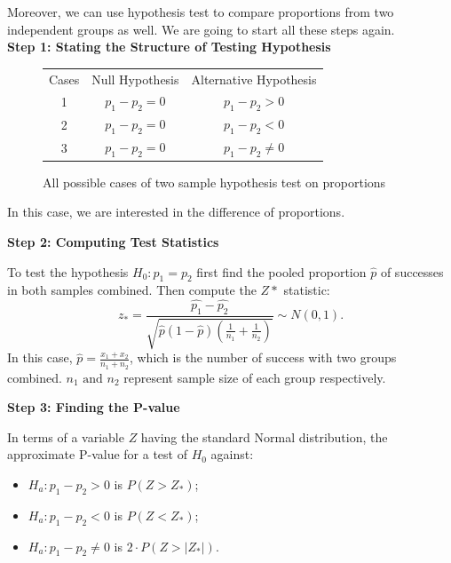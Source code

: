 Moreover, we can use hypothesis test to compare proportions from two independent groups as well. We are going to start all these steps again.\\

\textbf{Step 1: Stating the Structure of Testing Hypothesis}

\begin{center}
\begin{figure}[H]
\centering
\begin{tabular}{ c c c }
Cases & Null Hypothesis & Alternative Hypothesis \\
     1	   & $p_1 - p_2 = 0$ & $p_1 - p_2 > 0$ \\
     2	   & $p_1 - p_2 = 0$ & $p_1 - p_2 < 0$ \\
     3    & $p_1 - p_2 = 0$ & $p_1 - p_2 \neq 0$ \\
\end{tabular}
\caption{All possible cases of two sample hypothesis test on proportions}
\end{figure}
\end{center}
\vspace{-0.75cm}

In this case, we are interested in the difference of proportions.

\textbf{Step 2: Computing Test Statistics}

\begin{definition}
To test the hypothesis $H_0 : p_1 = p_2$ first find the pooled proportion $\hat{p}$ of successes in both samples combined. Then compute the $Z*$ statistic: \[ z_* = \frac{\hat{p_1}-\hat{p_2}}{\sqrt{\hat{p}(1-\hat{p})(\frac{1}{n_1}+ \frac{1}{n_2})}} \sim N(0,1).\]
In this case, $\hat{p} = \frac{x_1 + x_2}{n_1+n_2}$, which is the number of success with two groups combined. $n_1 \text{ and } n_2$ represent sample size of each group respectively.
\end{definition}

\textbf{Step 3: Finding the P-value}

In terms of a variable $Z$ having the standard Normal distribution, the approximate P-value for a test of $H_0$ against:

\begin{itemize}
	\item $H_a: p_1 - p_2 > 0$ is $P(Z > Z_*)$;
	\item $H_a: p_1 - p_2 < 0$ is $P(Z < Z_*)$;
	\item $H_a: p_1 - p_2 \neq 0$ is $2 \cdot P(Z > |Z_*|)$.
\end{itemize}

